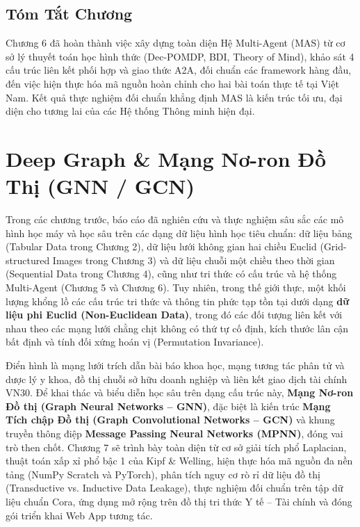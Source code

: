 \documentclass[12pt,a4paper]{report}
\begin{document}
\section{Tóm Tắt Chương}
Chương 6 đã hoàn thành việc xây dựng toàn diện Hệ Multi-Agent (MAS) từ cơ sở lý thuyết toán học hình thức (Dec-POMDP, BDI, Theory of Mind), khảo sát 4 cấu trúc liên kết phối hợp và giao thức A2A, đối chuẩn các framework hàng đầu, đến việc hiện thực hóa mã nguồn hoàn chỉnh cho hai bài toán thực tế tại Việt Nam. Kết quả thực nghiệm đối chuẩn khẳng định MAS là kiến trúc tối ưu, đại diện cho tương lai của các Hệ thống Thông minh hiện đại.


\chapter{Deep Graph \& Mạng Nơ-ron Đồ Thị (GNN / GCN)}

Trong các chương trước, báo cáo đã nghiên cứu và thực nghiệm sâu sắc các mô hình học máy và học sâu trên các dạng dữ liệu hình học tiêu chuẩn: dữ liệu bảng (Tabular Data trong Chương 2), dữ liệu lưới không gian hai chiều Euclid (Grid-structured Images trong Chương 3) và dữ liệu chuỗi một chiều theo thời gian (Sequential Data trong Chương 4), cũng như tri thức có cấu trúc và hệ thống Multi-Agent (Chương 5 và Chương 6). Tuy nhiên, trong thế giới thực, một khối lượng khổng lồ các cấu trúc tri thức và thông tin phức tạp tồn tại dưới dạng \textbf{dữ liệu phi Euclid (Non-Euclidean Data)}, trong đó các đối tượng liên kết với nhau theo các mạng lưới chằng chịt không có thứ tự cố định, kích thước lân cận bất định và tính đối xứng hoán vị (Permutation Invariance). 

Điển hình là mạng lưới trích dẫn bài báo khoa học, mạng tương tác phân tử và dược lý y khoa, đồ thị chuỗi sở hữu doanh nghiệp và liên kết giao dịch tài chính VN30. Để khai thác và biểu diễn học sâu trên dạng cấu trúc này, \textbf{Mạng Nơ-ron Đồ thị (Graph Neural Networks -- GNN)}, đặc biệt là kiến trúc \textbf{Mạng Tích chập Đồ thị (Graph Convolutional Networks -- GCN)} và khung truyền thông điệp \textbf{Message Passing Neural Networks (MPNN)}, đóng vai trò then chốt. Chương 7 sẽ trình bày toàn diện từ cơ sở giải tích phổ Laplacian, thuật toán xấp xỉ phổ bậc 1 của Kipf \& Welling, hiện thực hóa mã nguồn đa nền tảng (NumPy Scratch và PyTorch), phân tích nguy cơ rò rỉ dữ liệu đồ thị (Transductive vs. Inductive Data Leakage), thực nghiệm đối chuẩn trên tập dữ liệu chuẩn Cora, ứng dụng mở rộng trên đồ thị tri thức Y tế -- Tài chính và đóng gói triển khai Web App tương tác.
\end{document}

